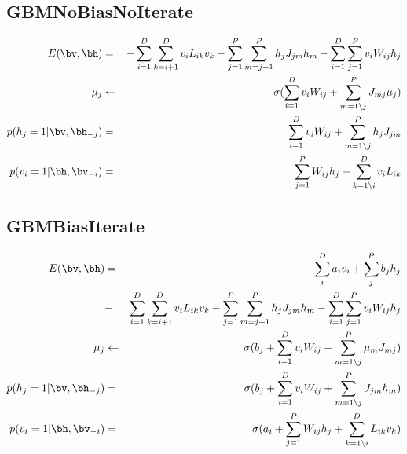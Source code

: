 \documentclass[a4paper]{jarticle}
\begin{document}
{\subsection{GBMNoBiasNoIterate}
\begin{eqnarray}
 E(\bv,\bh) &=&
  -\sum_{i=1}^{D} \sum_{k=i+1}^{D} v_i L_{ik} v_k
  -\sum_{j=1}^{P} \sum_{m=j+1}^{P} h_j J_{jm} h_m
  -\sum_{i=1}^{D} \sum_{j=1  }^{P} v_i W_{ij} h_j\\
 \mu_j &\leftarrow&
  \sigma(
   \sum_{i=1            }^{D} v_i    W_{ij}
  +\sum_{m=1\backslash j}^{P} J_{mj} \mu_j
  )\\
 p(h_j=1 | \bv, \bh_{-j})  &=&
    \sum_{i=1            }^{D} v_i W_{ij}
  + \sum_{m=1\backslash j}^{P} h_j J_{jm}\\
 p(v_i=1 | \bh, \bv_{-i}) &=&
   \sum_{j=1}^{P} W_{ij} h_j
  +\sum_{k=1\backslash i}^{D} v_i L_{ik} 
\end{eqnarray}

\subsection{GBMBiasIterate}
\begin{eqnarray}
 E(\bv,\bh)
 &=& \sum_{i}^{D} a_i v_i +\sum_{j}^{P} b_j h_j\\
 &-& \sum_{i=1}^{D}\sum_{k=i+1}^{D} v_i L_{ik} v_k
  -  \sum_{j=1}^{P}\sum_{m=j+1}^{P} h_j J_{jm} h_m
  -  \sum_{i=1}^{D}\sum_{j=1}^{P} v_i W_{ij} h_j\\
 \mu_j &\leftarrow&
  \sigma(
  b_j 
  + \sum_{i=1            }^{D} v_i W_{ij}
  + \sum_{m=1\backslash j}^{P} \mu_m J_{mj}
  )\\
 p(h_j=1 | \bv, \bh_{-j}) &=&
  \sigma(
  b_j
  +\sum_{i=1            }^{D} v_i W_{ij}
  +\sum_{m=1\backslash j}^{P} J_{jm} h_m
  )\\
 p(v_i=1 |\bh, \bv_{-i}) &=&
  \sigma(
  a_i
  +\sum_{j=1            }^{P} W_{ij} h_j
  +\sum_{k=1\backslash i}^{D} L_{ik} v_k
  )\\
\end{eqnarray}

}
\end{document}
